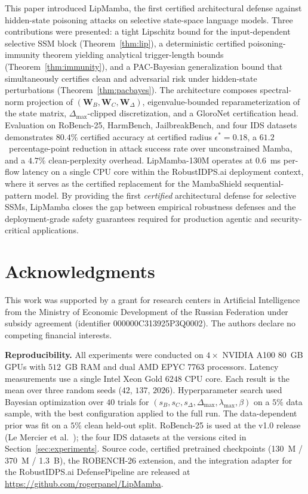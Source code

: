 \documentclass[journal,a4paper,10pt]{IEEEtran}
\theoremstyle{definition}
\theoremstyle{remark}
\newcommand{\modelname}{LipMamba}
\newcommand{\benchname}{ROBENCH-26}
\begin{document}
This paper introduced \modelname{}, the first certified architectural defense against hidden-state poisoning attacks on selective state-space language models. Three contributions were presented: a tight Lipschitz bound for the input-dependent selective SSM block (Theorem~\ref{thm:lip}), a deterministic certified poisoning-immunity theorem yielding analytical trigger-length bounds (Theorem~\ref{thm:immunity}), and a PAC-Bayesian generalization bound that simultaneously certifies clean and adversarial risk under hidden-state perturbations (Theorem~\ref{thm:pacbayes}). The architecture composes spectral-norm projection of $(\mathbf{W}_B, \mathbf{W}_C, \mathbf{W}_\Delta)$, eigenvalue-bounded reparameterization of the state matrix, $\Delta_{\max}$-clipped discretization, and a GloroNet certification head. Evaluation on RoBench-25, HarmBench, JailbreakBench, and four IDS datasets demonstrates $80.4\%$ certified accuracy at certified radius $\epsilon^* = 0.18$, a $61.2$~percentage-point reduction in attack success rate over unconstrained Mamba, and a $4.7\%$ clean-perplexity overhead. \modelname{}-130M operates at $0.6$~ms per-flow latency on a single CPU core within the RobustIDPS.ai deployment context, where it serves as the certified replacement for the MambaShield sequential-pattern model. By providing the first \emph{certified} architectural defense for selective SSMs, \modelname{} closes the gap between empirical robustness defenses and the deployment-grade safety guarantees required for production agentic and security-critical applications.


\section*{Acknowledgments}

This work was supported by a grant for research centers in Artificial Intelligence from the Ministry of Economic Development of the Russian Federation under subsidy agreement (identifier 000000C313925P3Q0002). The authors declare no competing financial interests.

\noindent\textbf{Reproducibility.} All experiments were conducted on $4 \times$ NVIDIA A100 80~GB GPUs with $512$~GB RAM and dual AMD EPYC 7763 processors. Latency measurements use a single Intel Xeon Gold $6248$ CPU core. Each result is the mean over three random seeds ($42$, $137$, $2026$). Hyperparameter search used Bayesian optimization over $40$ trials for $(s_B, s_C, s_\Delta, \Delta_{\max}, \lambda_{\max}, \beta)$ on a $5\%$ data sample, with the best configuration applied to the full run. The data-dependent prior was fit on a $5\%$ clean held-out split. RoBench-25 is used at the v1.0 release (Le Mercier et al.~\cite{lemercier2026hispa}); the four IDS datasets at the versions cited in Section~\ref{sec:experiments}. Source code, certified pretrained checkpoints (130~M / 370~M / 1.3~B), the \benchname{} extension, and the integration adapter for the RobustIDPS.ai DefensePipeline are released at \url{https://github.com/rogerpanel/LipMamba}.
\end{document}
